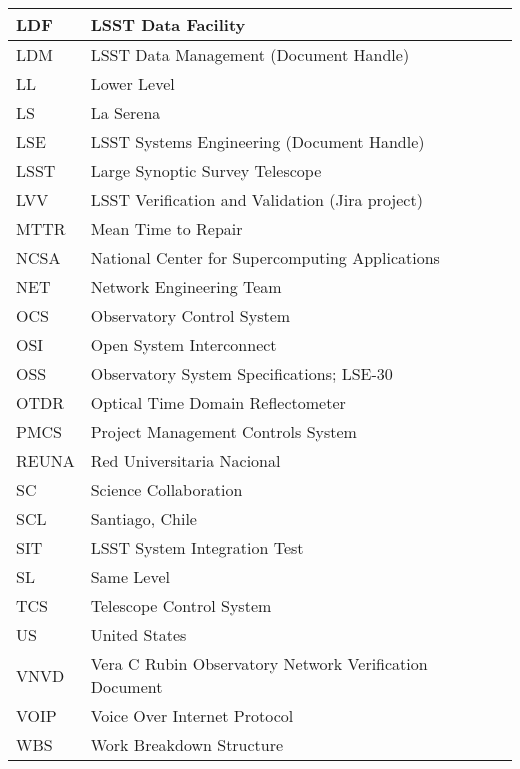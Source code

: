 \begin{longtable}{p{}p{}}
LDF & LSST Data Facility \\\hline
LDM & LSST Data Management (Document Handle) \\\hline
LL & Lower Level \\\hline
LS & La Serena \\\hline
LSE & LSST Systems Engineering (Document Handle) \\\hline
LSST & Large Synoptic Survey Telescope \\\hline
LVV & LSST Verification and Validation (Jira project) \\\hline
MTTR & Mean Time to Repair \\\hline
NCSA & National Center for Supercomputing Applications \\\hline
NET & Network Engineering Team \\\hline
OCS & Observatory Control System \\\hline
OSI & Open System Interconnect \\\hline
OSS & Observatory System Specifications; LSE-30 \\\hline
OTDR & Optical Time Domain Reflectometer \\\hline
PMCS & Project Management Controls System \\\hline
REUNA & Red Universitaria Nacional \\\hline
SC & Science Collaboration \\\hline
SCL & Santiago, Chile \\\hline
SIT & LSST System Integration Test \\\hline
SL & Same Level \\\hline
TCS & Telescope Control System \\\hline
US & United States \\\hline
VNVD & Vera C Rubin Observatory Network Verification Document \\\hline
VOIP & Voice Over Internet Protocol \\\hline
WBS & Work Breakdown Structure \\\hline
\end{longtable}

